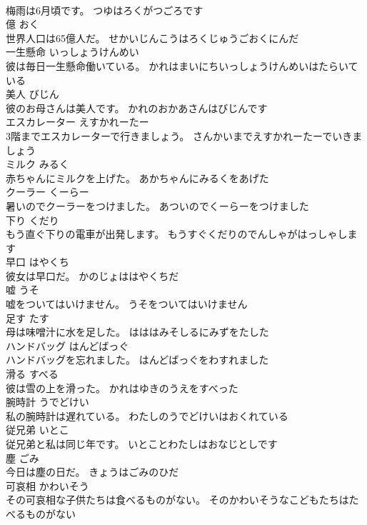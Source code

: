 \documentclass[8pt]{extreport}
\begin{document}
\begin{CJK}{UTF8}{min}
\\	梅雨は6月頃です。	つゆはろくがつごろです	
\\	億	おく	
\\	世界人口は65億人だ。	せかいじんこうはろくじゅうごおくにんだ	
\\	一生懸命	いっしょうけんめい	
\\	彼は毎日一生懸命働いている。	かれはまいにちいっしょうけんめいはたらいている	
\\	美人	びじん	
\\	彼のお母さんは美人です。	かれのおかあさんはびじんです	
\\	エスカレーター	えすかれーたー	
\\	3階までエスカレーターで行きましょう。	さんかいまでえすかれーたーでいきましょう	
\\	ミルク	みるく	
\\	赤ちゃんにミルクを上げた。	あかちゃんにみるくをあげた	
\\	クーラー	くーらー	
\\	暑いのでクーラーをつけました。	あついのでくーらーをつけました	
\\	下り	くだり	
\\	もう直ぐ下りの電車が出発します。	もうすぐくだりのでんしゃがはっしゃします	
\\	早口	はやくち	
\\	彼女は早口だ。	かのじょははやくちだ	
\\	嘘	うそ	
\\	嘘をついてはいけません。	うそをついてはいけません	
\\	足す	たす	
\\	母は味噌汁に水を足した。	はははみそしるにみずをたした	
\\	ハンドバッグ	はんどばっぐ	
\\	ハンドバッグを忘れました。	はんどばっぐをわすれました	
\\	滑る	すべる	
\\	彼は雪の上を滑った。	かれはゆきのうえをすべった	
\\	腕時計	うでどけい	
\\	私の腕時計は遅れている。	わたしのうでどけいはおくれている	
\\	従兄弟	いとこ	
\\	従兄弟と私は同じ年です。	いとことわたしはおなじとしです	
\\	塵	ごみ	
\\	今日は塵の日だ。	きょうはごみのひだ	
\\	可哀相	かわいそう	
\\	その可哀相な子供たちは食べるものがない。	そのかわいそうなこどもたちはたべるものがない	

\end{CJK}
\end{document}
